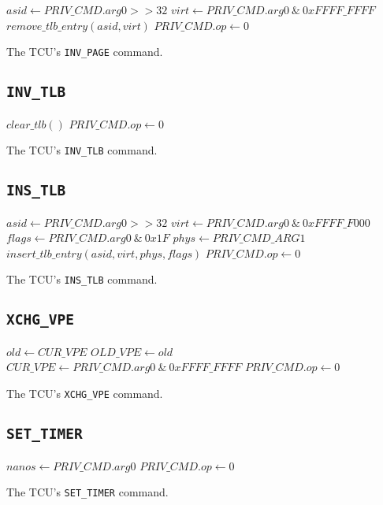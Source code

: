 \begin{algorithm}[H]
    $asid \gets PRIV\_CMD.arg0 >> 32$\;
    $virt \gets PRIV\_CMD.arg0\ \&\ 0xFFFF\_FFFF$\;
    \BlankLine
    $remove\_tlb\_entry(asid, virt)$\;
    $PRIV\_CMD.op \gets 0$\;
    \caption{The TCU's \texttt{INV\_PAGE} command.}
\end{algorithm}

\subsection{\texttt{INV\_TLB}}

\begin{algorithm}[H]
    $clear\_tlb()$\;
    $PRIV\_CMD.op \gets 0$\;
    \caption{The TCU's \texttt{INV\_TLB} command.}
\end{algorithm}

\subsection{\texttt{INS\_TLB}}

\begin{algorithm}[H]
    $asid \gets PRIV\_CMD.arg0 >> 32$\;
    $virt \gets PRIV\_CMD.arg0\ \&\ 0xFFFF\_F000$\;
    $flags \gets PRIV\_CMD.arg0\ \&\ 0x1F$\;
    $phys \gets PRIV\_CMD\_ARG1$\;
    \BlankLine
    $insert\_tlb\_entry(asid, virt, phys, flags)$\;
    $PRIV\_CMD.op \gets 0$\;
    \caption{The TCU's \texttt{INS\_TLB} command.}
\end{algorithm}
\extend{}

\subsection{\texttt{XCHG\_VPE}}

\begin{algorithm}[H]
    $old \gets CUR\_VPE$\;
    $OLD\_VPE \gets old$\;
    $CUR\_VPE \gets PRIV\_CMD.arg0\ \&\ 0xFFFF\_FFFF$\;
    \BlankLine
    $PRIV\_CMD.op \gets 0$\;
    \caption{The TCU's \texttt{XCHG\_VPE} command.}
\end{algorithm}

\subsection{\texttt{SET\_TIMER}}

\begin{algorithm}[H]
    $nanos \gets PRIV\_CMD.arg0$\;
    \BlankLine
    $PRIV\_CMD.op \gets 0$\;
    \caption{The TCU's \texttt{SET\_TIMER} command.}
\end{algorithm}

